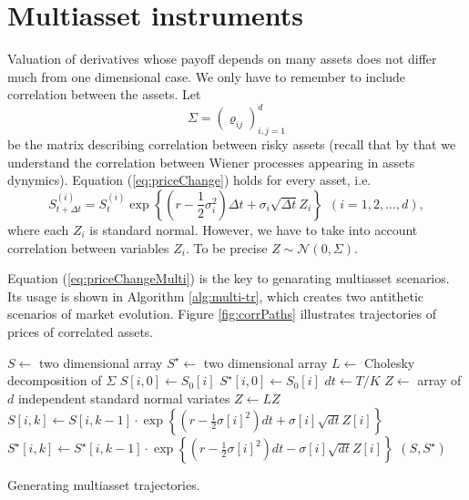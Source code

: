 \documentclass[a4paper,11pt, twoside]{book}
\theoremstyle{definition}
\theoremstyle{remark}
\begin{document}
\section{Multiasset instruments}
\label{sec:multi-asset}
Valuation of derivatives whose payoff depends on many assets does not differ much from one dimensional case. We only have to remember to include correlation between the assets. Let
\[ \Sigma = \left( \varrho_{ij} \right)_{i,j=1}^d \]
be the matrix describing correlation between risky assets (recall that by that we understand the correlation between Wiener processes appearing in assets dynymics). Equation (\ref{eq:priceChange}) holds for every asset, i.e.
\begin{equation}
 \label{eq:priceChangeMulti}
  S^{(i)}_{t + {\Delta} t} = S^{(i)}_t \exp\left\{ (r - \frac{1}{2}\sigma_i^2)\Delta t + \sigma_i \sqrt{\Delta t} Z_i \right\}\ \ (i = 1,2,\ldots,d),
\end{equation}
where each $Z_i$ is standard normal. However, we have to take into account correlation between variables $Z_i$. To be precise $Z \sim \mathcal{N}(0, \Sigma)$.

Equation (\ref{eq:priceChangeMulti}) is the key to genarating multiasset scenarios. Its usage is shown in Algorithm \ref{alg:multi-tr}, which creates two antithetic scenarios of market evolution. Figure \ref{fig:corrPaths} illustrates trajectories of prices of correlated assets.

\begin{algorithm}
 \begin{algorithmic}[1]
  
  \State $S \gets$ two dimensional array 
  \State $S^\star \gets$ two dimensional array 
  \State $L \gets$ Cholesky decomposition of $\Sigma$ 
    \State $S[i,0] \gets S_0[i]$
    \State $S^\star[i,0] \gets S_0[i]$
  \EndFor
  \State $dt \gets T/K$
    \State $Z \gets$ array of $d$ independent standard normal variates
    \State $Z \gets LZ$ 
      \State $S[i, k] \gets S[i, k-1] \cdot \exp\left\{ (r - \frac{1}{2}\sigma[i]^2) dt + \sigma[i] \sqrt{dt} Z[i] \right\}$
      \State $S^\star[i, k] \gets S^\star[i, k-1] \cdot \exp\left\{ (r - \frac{1}{2}\sigma[i]^2) dt - \sigma[i] \sqrt{dt} Z[i] \right\}$
    \EndFor
  \EndFor
  \State \Return $(S, S^\star)$
  \EndFunction
 \end{algorithmic}
 \caption{Generating multiasset trajectories.}
 \label{alg:multi-tr}
\end{algorithm}
\end{document}
